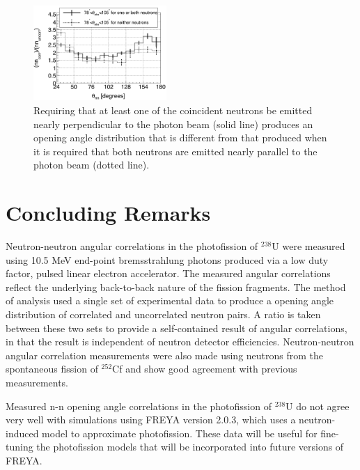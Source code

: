 \documentclass[%
 reprint,
 amsmath,amssymb,
 aps,
 nofootinbib
]{revtex4-1}
\begin{document}
\begin{figure}
\includegraphics[width=0.45\textwidth]{theta_abs_two-neutron.png}
\caption{Requiring that at least one of the coincident neutrons be emitted nearly perpendicular to the photon beam (solid line) produces an opening angle distribution that is different from that produced when it is required that both neutrons are emitted nearly parallel to the photon beam (dotted line).}
\label{fig:theta_abs_two_neutron}
\end{figure}

\section{Concluding Remarks}
Neutron-neutron angular correlations in the photofission of $^{238}$U were measured using 10.5 MeV end-point bremsstrahlung photons produced via a low duty factor, pulsed linear electron accelerator.
The measured angular correlations reflect the underlying back-to-back nature of the fission fragments.
The method of analysis used a single set of experimental data to produce a opening angle distribution of correlated and uncorrelated neutron pairs.
A ratio is taken between these two sets to provide a self-contained result of angular correlations, in that the result is independent of neutron detector efficiencies.
Neutron-neutron angular correlation measurements were also made using neutrons from the spontaneous fission of $^{252}$Cf and show good agreement with previous measurements.

Measured n-n opening angle correlations in the photofission of $^{238}$U do not agree very well with simulations using FREYA version 2.0.3, which uses a neutron-induced model to approximate photofission.
These data will be useful for fine-tuning the photofission models that will be incorporated into future versions of FREYA.
\end{document}
